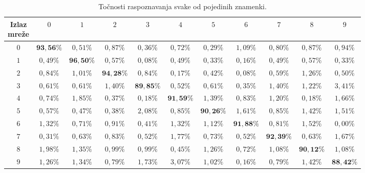 \begin{table}[htb]
    \caption{Točnosti raspoznavanja svake od pojedinih znamenki.}
    \label{tab:per-number-results}
    \scriptsize
    \centering
    \setlength{\tabcolsep}{0.05cm}
    \begin{tabular}{|c|c|c|c|c|c|c|c|c|c|c|}
        \hline
        \diagbox{Očekivana\\znamenka}{Izlaz\\mreže} & $0$ & $1$ & $2$ & $3$ & $4$ & $5$ & $6$ & $7$ & $8$ & $9$ \\
        \hline
        $0$ & $\boldsymbol{93{,}56\%}$ & $0{,}51\%$ & $0{,}87\%$ & $0{,}36\%$ & $0{,}72\%$ & $0{,}29\%$ & $1{,}09\%$
        & $0{,}80\%$ & $0{,}87\%$ & $0{,}94\%$ \\
        \hline
        $1$ & $0{,}49\%$ & $\boldsymbol{96{,}50\%}$ & $0{,}57\%$ & $0{,}08\%$ & $0{,}49\%$ & $0{,}33\%$ & $0{,}16\%$
        & $0{,}49\%$ & $0{,}57\%$ & $0{,}33\%$ \\
        \hline
        $2$ & $0{,}84\%$ & $1{,}01\%$ & $\boldsymbol{94{,}28\%}$ & $0{,}84\%$ & $0{,}17\%$ & $0{,}42\%$ & $0{,}08\%$
        & $0{,}59\%$ & $1{,}26\%$ & $0{,}50\%$ \\
        \hline
        $3$ & $0{,}61\%$ & $0{,}61\%$ & $1{,}40\%$ & $\boldsymbol{89{,}85\%}$ & $0{,}52\%$ & $0{,}61\%$ & $0{,}35\%$
        & $1{,}40\%$ & $1{,}22\%$ & $3{,}41\%$ \\
        \hline
        $4$ & $0{,}74\%$ & $1{,}85\%$ & $0{,}37\%$ & $0{,}18\%$ & $\boldsymbol{91{,}59\%}$ & $1{,}39\%$ & $0{,}83\%$
        & $1{,}20\%$ & $0{,}18\%$ & $1{,}66\%$ \\
        \hline
        $5$ & $0{,}57\%$ & $0{,}47\%$ & $0{,}38\%$ & $2{,}08\%$ & $0{,}85\%$ & $\boldsymbol{90{,}26\%}$ & $1{,}61\%$
        & $0{,}85\%$ & $1{,}42\%$ & $1{,}51\%$ \\
        \hline
        $6$ & $1{,}32\%$ & $0{,}71\%$ & $0{,}91\%$ & $0{,}41\%$ & $1{,}32\%$ & $1{,}12\%$ & $\boldsymbol{91{,}88\%}$
        & $0{,}81\%$ & $1{,}52\%$ & $0{,}00\%$ \\
        \hline
        $7$ & $0{,}31\%$ & $0{,}63\%$ & $0{,}83\%$ & $0{,}52\%$ & $1{,}77\%$ & $0{,}73\%$ & $0{,}52\%$
        & $\boldsymbol{92{,}39\%}$ & $0{,}63\%$ & $1{,}67\%$ \\
        \hline
        $8$ & $1{,}98\%$ & $1{,}35\%$ & $0{,}99\%$ & $0{,}99\%$ & $0{,}45\%$ & $1{,}26\%$ & $0{,}72\%$ & $1{,}08\%$
        & $\boldsymbol{90{,}12\%}$ & $1{,}08\%$ \\
        \hline
        $9$ & $1{,}26\%$ & $1{,}34\%$ & $0{,}79\%$ & $1{,}73\%$ & $3{,}07\%$ & $1{,}02\%$ & $0{,}16\%$ & $0{,}79\%$
        & $1{,}42\%$ & $\boldsymbol{88{,}42\%}$ \\
        \hline
    \end{tabular}
\end{table}
